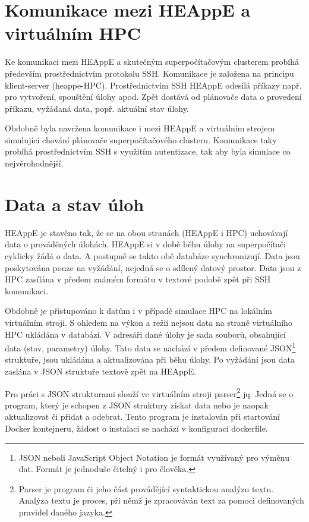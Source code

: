 \section{Komunikace mezi HEAppE a virtuálním HPC}
Ke komunikaci mezi HEAppE a skutečným superpočítačovým clusterem probíhá především prostřednictvím protokolu SSH. Komunikace je založena na principu klient-server (heappe-HPC). Prostřednictvím SSH HEAppE odesílá příkazy např. pro vytvoření, spouštění úlohy apod. Zpět dostává od plánovače data o provedení příkazu, vyžádaná data, popř. aktuální stav úlohy.

Obdobně byla navržena komunikace i mezi HEAppE a virtuálním strojem simulující chování plánovače superpočítačového clusteru. Komunikace taky probíhá prostřednictvím SSH s využitím autentizace, tak aby byla simulace co nejvěrohodnější.

\section{Data a stav úloh}
HEAppE je stavěno tak, že se na obou stranách (HEAppE i HPC) uchovávají data o prováděných úlohách. HEAppE si v době běhu úlohy na superpočítači cyklicky žádá o data. A postupně se takto obě databáze synchronizují. Data jsou poskytována pouze na vyžádání, nejedná se o sdílený datový prostor. Data jsou z HPC zasílána v předem známém formátu v textové podobě zpět při SSH komunikaci.

Obdobně je přistupováno k datům i v případě simulace HPC na lokálním virtuálním stroji. S ohledem na výkon a režii nejsou data na straně virtuálního HPC ukládána v databázi. V adresáři dané úlohy je sada souborů, obsahující data (stav, parametry) úlohy. Tato data se nachází v předem definované JSON\footnote{JSON neboli JavaScript Object Notation je formát využívaný pro výměnu dat. Formát je jednoduše čitelný i pro člověka.\cite{lJoeVuQg92zsjaAe}}  struktuře, jsou ukládána a aktualizována při běhu úlohy. Po vyžádání jsou data zaslána v JSON struktuře textově zpět na HEAppE.

Pro práci s JSON strukturami slouží ve virtuálním stroji parser\footnote{Parser je program či jeho část provádějící syntaktickou analýzu textu. Analýza textu je proces, při němž je zpracováván text za pomoci definovaných pravidel daného jazyka.\cite{uEN4MdNhBpkZmkHF}} jq\cite{qibOqajDMnKYNjXq}. Jedná se o program, který je schopen z JSON struktury získat data nebo je naopak aktualizovat či přidat a odebrat. Tento program je instalován při startování Docker kontejneru, žádost o instalaci se nachází v konfiguraci dockerfile.

